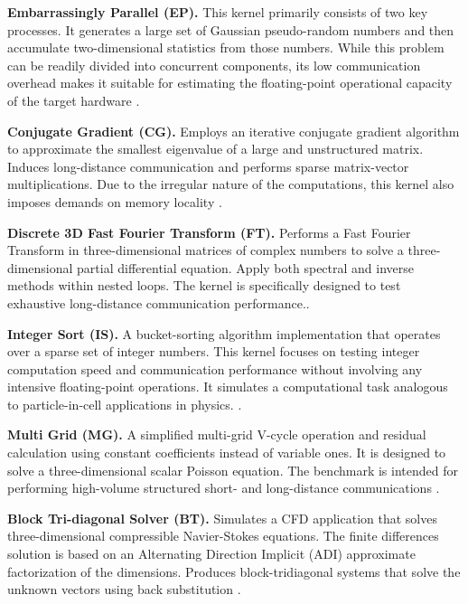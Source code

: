         \textbf{Embarrassingly Parallel (EP).}
        This kernel primarily consists of two key processes. It generates a large set of Gaussian pseudo-random numbers and then accumulate two-dimensional statistics from those numbers. While this problem can be readily divided into concurrent components, its low communication overhead makes it suitable for estimating the floating-point operational capacity of the target hardware \cite{npb-results-11-96}. 

        \textbf{Conjugate Gradient (CG).}
        Employs an iterative conjugate gradient algorithm to approximate the smallest eigenvalue of a large and unstructured matrix. Induces long-distance communication and performs sparse matrix-vector multiplications. Due to the irregular nature of the computations, this kernel also imposes demands on memory locality \cite{npb-results-11-96}.
        
        \textbf{Discrete 3D Fast Fourier Transform (FT).}
        Performs a Fast Fourier Transform in three-dimensional matrices of complex numbers to solve a three-dimensional partial differential equation. Apply both spectral and inverse methods within nested loops. The kernel is specifically designed to test exhaustive long-distance communication performance.\cite{npb-results-11-96, NPB-2.0}.

        \textbf{Integer Sort (IS).}
        A bucket-sorting algorithm implementation that operates over a sparse set of integer numbers. This kernel focuses on testing integer computation speed and communication performance without involving any intensive floating-point operations. It simulates a computational task analogous to particle-in-cell applications in physics. \cite{npb-results-11-96, nasomp}.

        \textbf{Multi Grid (MG).}
        A simplified multi-grid V-cycle operation and residual calculation using constant coefficients instead of variable ones. It is designed to solve a three-dimensional scalar Poisson equation. The benchmark is intended for performing high-volume structured short- and long-distance communications \cite{npb-results-11-96, NPB-2.0}.

        \textbf{Block Tri-diagonal Solver (BT).}
        Simulates a CFD application that solves three-dimensional compressible Navier-Stokes equations. The finite differences solution is based on an Alternating Direction Implicit (ADI) approximate factorization of the dimensions. Produces block-tridiagonal systems that solve the unknown vectors using back substitution \cite{npb-results-11-96, NPB-2.0}.

